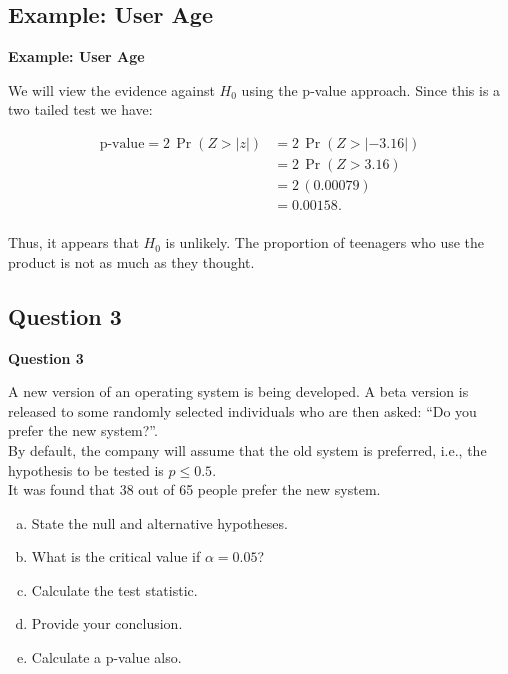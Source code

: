 \documentclass[compress]{beamer}        %
\makeatletter
\newcommand{\tcb}{\textcolor{beamer@blendedblue}}
\makeatother
\begin{document}
\subsection{Example: User Age}
\begin{frame}{\bf \tcb{Example: User Age}}

We will view the evidence against $H_0$ using the p-value approach. Since this is a two tailed test we have:

\begin{align*}
\text{p-value} = 2 \, \Pr(Z > |z|) &= 2 \, \Pr(Z > |-3.16|) \\[0.1cm]
&= 2 \, \Pr(Z > 3.16) \\[0.1cm]
&= 2 \, (0.00079) \\[0.1cm]
&= 0.00158. \\[0.1cm]
\end{align*}

Thus, it appears that $H_0$ is unlikely. The proportion of teenagers who use the product is not as much as they thought.


\end{frame}



\subsection{Question 3}
\begin{frame}{\bf \tcb{Question 3}}

A new version of an operating system is being developed. A beta version is released to some randomly selected individuals who are then asked: ``Do you prefer the new system?''.\\[0.2cm]

By default, the company will assume that the old system is preferred, i.e., the hypothesis to be tested is $p \le 0.5$.\\[0.2cm]

It was found that 38 out of 65 people prefer the new system.\\[0.3cm]

\begin{enumerate}[a)]\itemsep0.2cm
\item State the null and alternative hypotheses.
\item What is the critical value if $\alpha = 0.05$?
\item Calculate the test statistic.
\item Provide your conclusion.
\item Calculate a p-value also.
\end{enumerate}


\end{frame}
\end{document}
